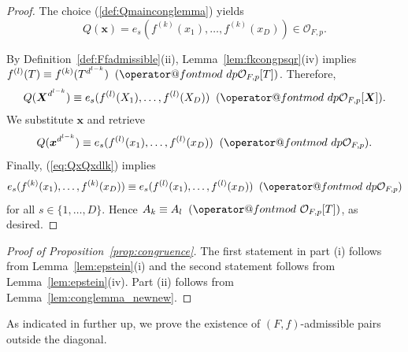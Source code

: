\documentclass[12pt,oneside,a4]{amsart}
\makeatletter
\newcommand{\cO}{\mathcal{O}}
\numberwithin{maincounter}{section}
\numberwithin{equation}{section}
\def\imod#1{\allowbreak\mkern10mu({\operator@font mod}\,\,#1)}
\makeatother
\begin{document}
\begin{proof}
  The choice (\ref{def:Qmainconglemma}) yields
  \begin{equation*}
    Q(\boldsymbol x) = e_s(f^{(k)}(x_1),\ldots,f^{(k)}(x_D)) \in \cO_{F,p}.
  \end{equation*}

  By Definition~\ref{def:Ffadmissible}(ii), 
  Lemma~\ref{lem:fkcongpsqr}(iv) implies $f^{(l)}(T) \equiv
  f^{(k)}(T^{d^{l-k}}) \imod{dp\cO_{F,p}[T]}$. Therefore,
  \begin{equation*}
    Q(\boldsymbol X^{d^{l-k}})
    \equiv  e_s(f^{(l)}(X_1),\ldots,f^{(l)}(X_D))
    \imod{dp\cO_{F,p}[\boldsymbol X]}.
  \end{equation*}
  We substitute $\boldsymbol x$ and retrieve
  \begin{equation*}
    Q(\boldsymbol x^{d^{l-k}}) \equiv
    e_s(f^{(l)}(x_1),\ldots,f^{(l)}(x_D))
    \imod{dp \cO_{F,p}}. 
  \end{equation*}
  Finally, (\ref{eq:QxQxdlk}) implies
  \begin{equation*}
    e_s(f^{(k)}(x_1),\ldots,f^{(k)}(x_D)) \equiv
    e_s(f^{(l)}(x_1),\ldots,f^{(l)}(x_D))
    \imod{dp \cO_{F,p}}
  \end{equation*}
  for all $s\in \{1,\ldots,D\}$. Hence $A_k\equiv A_l
  \imod{\cO_{F,p}[T]}$, as desired. 
\end{proof}

\begin{proof}[Proof of Proposition~\ref{prop:congruence}]  
  The first statement in part (i) follows from
  Lemma~\ref{lem:epstein}(i) and the second statement follows
  from   Lemma~\ref{lem:epstein}(iv).
  Part (ii) follows from Lemma~\ref{lem:conglemma_newnew}.
\end{proof}

As indicated in further up, we prove the existence of
$(F,f)$-admissible pairs outside the diagonal.
\end{document}
